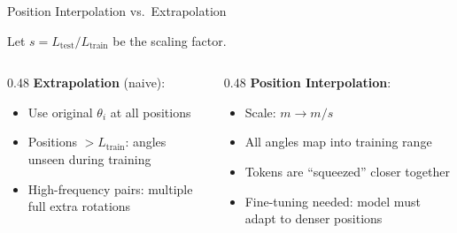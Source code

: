 \begin{frame}{Position Interpolation vs.\ Extrapolation}

  Let $s = L_{\text{test}} / L_{\text{train}}$ be the scaling factor.

  \vspace{0.3em}
  \begin{columns}[T]
    \begin{column}{0.48\textwidth}
      \textbf{Extrapolation} (naive):
      \begin{itemize}
        \item Use original $\theta_i$ at all positions
        \item Positions $> L_{\text{train}}$: angles unseen during training
        \item High-frequency pairs: multiple full extra rotations
      \end{itemize}

      \vspace{0.3em}
      \begin{center}
      \end{center}
    \end{column}

    \begin{column}{0.48\textwidth}
      \textbf{Position Interpolation}:
      \begin{itemize}
        \item Scale: $m \to m/s$
        \item All angles map into training range
        \item Tokens are ``squeezed'' closer together
        \item Fine-tuning needed: model must adapt to denser positions
      \end{itemize}


\end{column}
\end{columns}
\end{frame}
